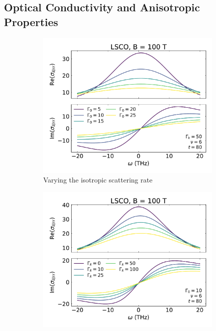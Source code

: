 \subsection{Optical Conductivity and Anisotropic Properties}

\begin{figure}
    \centering
    \begin{subfigure}{0.495\textwidth}
        \includegraphics[width=\textwidth]{figures/vary_gamma_0}
        \caption{Varying the isotropic scattering rate}
        \label{fig:vary_gamma_0}
    \end{subfigure}
    \begin{subfigure}{0.495\textwidth}
        \includegraphics[width=\textwidth]{figures/vary_gamma_k}

\end{subfigure}
\end{figure}
